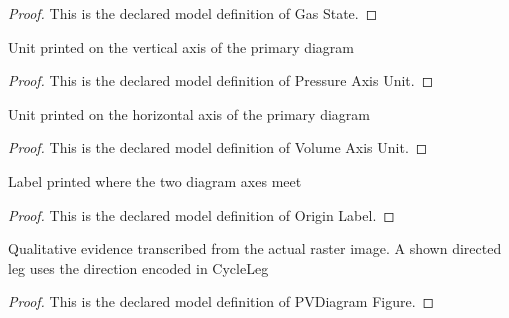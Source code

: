 \begin{proof}
  This is the declared model definition of Gas State.
\end{proof}
\begin{definition}
  \label{def:physics:phyx-mini-0353:phyxminiproblems-problemphyxmini0353-pressureaxisunit}
  Unit printed on the vertical axis of the primary diagram
\end{definition}
\begin{proof}
  This is the declared model definition of Pressure Axis Unit.
\end{proof}
\begin{definition}
  \label{def:physics:phyx-mini-0353:phyxminiproblems-problemphyxmini0353-volumeaxisunit}
  Unit printed on the horizontal axis of the primary diagram
\end{definition}
\begin{proof}
  This is the declared model definition of Volume Axis Unit.
\end{proof}
\begin{definition}
  \label{def:physics:phyx-mini-0353:phyxminiproblems-problemphyxmini0353-originlabel}
  Label printed where the two diagram axes meet
\end{definition}
\begin{proof}
  This is the declared model definition of Origin Label.
\end{proof}
\begin{definition}
  \label{def:physics:phyx-mini-0353:phyxminiproblems-problemphyxmini0353-pvdiagramfigure}
  Qualitative evidence transcribed from the actual raster image. A shown directed leg uses the direction encoded in CycleLeg
\end{definition}
\begin{proof}
  This is the declared model definition of PVDiagram Figure.
\end{proof}

